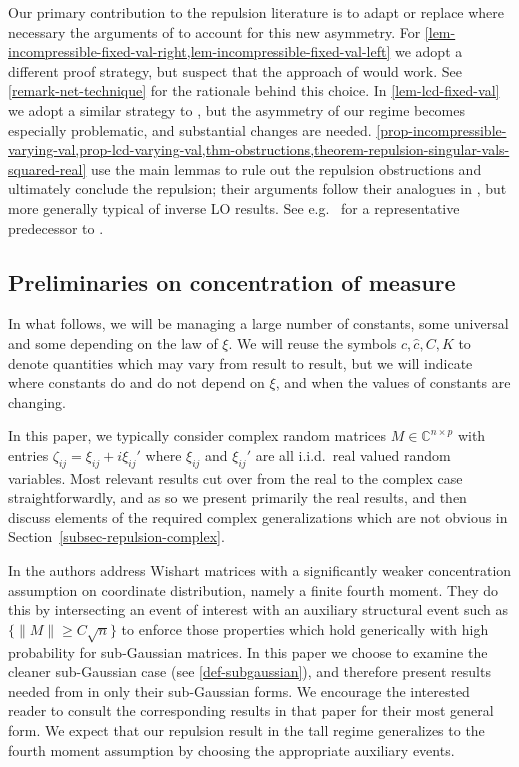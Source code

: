 \documentclass[11pt]{article}
\numberwithin{equation}{section}
\theoremstyle{remark}
\newcommand{\C}{\mathbb{C}}
\begin{document}
Our primary contribution to the repulsion literature is to adapt or replace where necessary the arguments of \cite{christoffersen2025gaps} to account for this new asymmetry. For \cref{lem-incompressible-fixed-val-right,lem-incompressible-fixed-val-left} we adopt a different proof strategy, but suspect that the approach of \cite{christoffersen2025gaps} would work. See \cref{remark-net-technique} for the rationale behind this choice. In \cref{lem-lcd-fixed-val} we adopt a similar strategy to \cite{christoffersen2025gaps}, but the asymmetry of our regime becomes especially problematic, and substantial changes are needed. \cref{prop-incompressible-varying-val,prop-lcd-varying-val,thm-obstructions,theorem-repulsion-singular-vals-squared-real} use the main lemmas to rule out the repulsion obstructions and ultimately conclude the repulsion; their arguments follow their analogues in \cite{christoffersen2025gaps}, but more generally typical of inverse LO results. See e.g.\ \cite{nguyen2015randommatricestailbounds} for a representative predecessor to \cite{christoffersen2025gaps}.

\subsection{Preliminaries on concentration of measure}\label{subsec-prob-prelims}
In what follows, we will be managing a large number of constants, some universal and some depending on the law of $\xi$. We will reuse the symbols $c, \hat{c}, C, K$ to denote quantities which may vary from result to result, but we will indicate where constants do and do not depend on $\xi$, and when the values of constants are changing.

In this paper, we typically consider complex random matrices $M \in \C^{n \times p}$ with entries $\zeta_{ij} = \xi_{ij} + i\xi_{ij}'$ where $\xi_{ij}$ and $\xi_{ij}'$ are all i.i.d.\ real valued random variables. Most relevant results cut over from the real to the complex case straightforwardly, and as so we present primarily the real results, and then discuss elements of the required complex generalizations which are not obvious in Section~\ref{subsec-repulsion-complex}. 

In \cite{christoffersen2025gaps} the authors address Wishart matrices with a significantly weaker concentration assumption on coordinate distribution, namely a finite fourth moment. They do this by intersecting an event of interest with an auxiliary structural event such as $\{\| M \| \geq C \sqrt{n} \}$ to enforce those properties which hold generically with high probability for sub-Gaussian matrices. In this paper we choose to examine the cleaner sub-Gaussian case (see \cref{def-subgaussian}), and therefore present results needed from \cite{christoffersen2025gaps} in only their sub-Gaussian forms. We encourage the interested reader to consult the corresponding results in that paper for their most general form. We expect that our repulsion result in the tall regime generalizes to the fourth moment assumption by choosing the appropriate auxiliary events.
\end{document}
